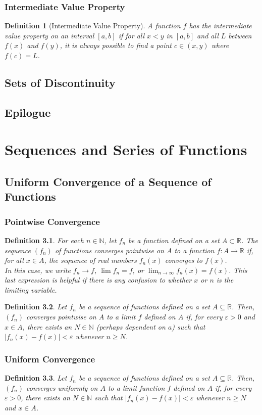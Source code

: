 \documentclass[10pt]{report}
\newtheorem{def3}{Definition}[subsection]
\newcommand{\eps}{\varepsilon}
\begin{document}
\subsection{Intermediate Value Property}
\begin{def3}[Intermediate Value Property]
A function $f$ has the intermediate value property on an interval $[a,b]$ if for all $x<y$ in $[a,b]$ and all $L$ between $f(x)$ and $f(y)$, it is always possible to find a point $c\in(x,y)$ where $f(c)=L$.
\end{def3}
\section{Sets of Discontinuity}
\section{Epilogue}

\chapter{Sequences and Series of Functions}
\section{Uniform Convergence of a Sequence of Functions}
\subsection{Pointwise Convergence}
\begin{def3}
For each $n\in\mathbb{N}$, let $f_n$ be a function defined on a set $A\subset\mathbb{R}$. The sequence $(f_n)$ of functions converges pointwise on $A$ to a function $f:A\to\mathbb{R}$ if, for all $x\in A$, the sequence of real numbers $f_n(x)$ converges to $f(x)$.\\
In this case, we write $f_n\to f$, $\lim f_n=f$, or $\lim_{n\to\infty} f_n(x)=f(x)$. This last expression is helpful if there is any confusion to whether $x$ or $n$ is the limiting variable.
\end{def3}
\begin{def3}
Let $f_n$ be a sequence of functions defined on a set $A\subseteq\mathbb{R}$. Then, $(f_n)$ converges pointwise on $A$ to a limit $f$ defined on $A$ if, for every $\eps>0$ and $x\in A$, there exists an $N\in\mathbb{N}$ (perhaps dependent on $a$) such that $|f_n(x)-f(x)|<\eps$ whenever $n\geq N$.
\end{def3}
\subsection{Uniform Convergence}
\begin{def3}
Let $f_n$ be a sequence of functions defined on a set $A\subseteq \mathbb{R}$. Then, $(f_n)$ converges uniformly on $A$ to a limit function $f$ defined on $A$ if, for every $\eps>0$, there exists an $N\in\mathbb{N}$ such that $|f_n(x)-f(x)|<\eps$ whenever $n\geq N$ and $x\in A$.
\end{def3}
\end{document}
